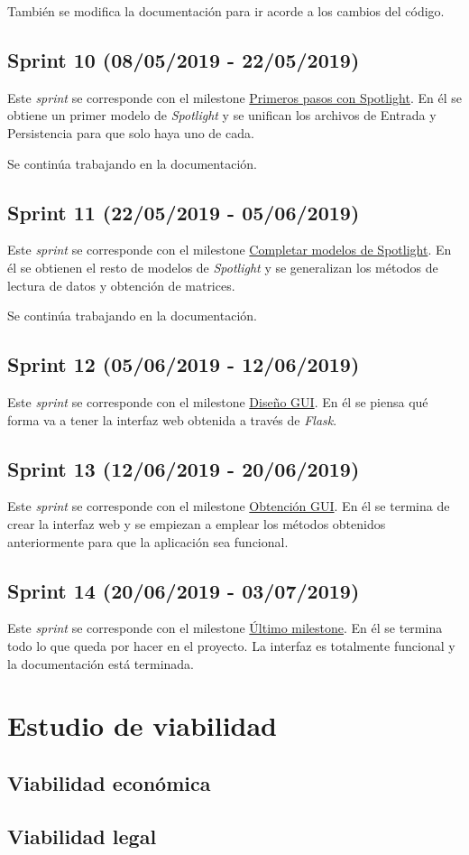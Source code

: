 También se modifica la documentación para ir acorde a los cambios del código.

\subsection{Sprint 10 (08/05/2019 - 22/05/2019)}\label{sprint-10}
Este \textit{sprint} se corresponde con el milestone \href{https://github.com/rnc0011/SistemaRecomendacionTFG/milestone/11}{Primeros pasos con Spotlight}. En él se obtiene un primer modelo de \textit{Spotlight} y se unifican los archivos de Entrada y Persistencia para que solo haya uno de cada.

Se continúa trabajando en la documentación.

\subsection{Sprint 11 (22/05/2019 - 05/06/2019)}\label{sprint-11}
Este \textit{sprint} se corresponde con el milestone \href{https://github.com/rnc0011/SistemaRecomendacionTFG/milestone/12}{Completar modelos de Spotlight}. En él se obtienen el resto de modelos de \textit{Spotlight} y se generalizan los métodos de lectura de datos y obtención de matrices.

Se continúa trabajando en la documentación.

\subsection{Sprint 12 (05/06/2019 - 12/06/2019)}\label{sprint-12}
Este \textit{sprint} se corresponde con el milestone \href{https://github.com/rnc0011/SistemaRecomendacionTFG/milestone/13}{Diseño GUI}. En él se piensa qué forma va a tener la interfaz web obtenida a través de \textit{Flask}.

\subsection{Sprint 13 (12/06/2019 - 20/06/2019)}\label{sprint-13}
Este \textit{sprint} se corresponde con el milestone \href{https://github.com/rnc0011/SistemaRecomendacionTFG/milestone/14}{Obtención GUI}. En él se termina de crear la interfaz web y se empiezan a emplear los métodos obtenidos anteriormente para que la aplicación sea funcional.

\subsection{Sprint 14 (20/06/2019 - 03/07/2019)}\label{sprint-14}
Este \textit{sprint} se corresponde con el milestone \href{https://github.com/rnc0011/SistemaRecomendacionTFG/milestone/15}{Último milestone}. En él se termina todo lo que queda por hacer en el proyecto. La interfaz es totalmente funcional y la documentación está terminada.

\section{Estudio de viabilidad}

\subsection{Viabilidad económica}

\subsection{Viabilidad legal}



